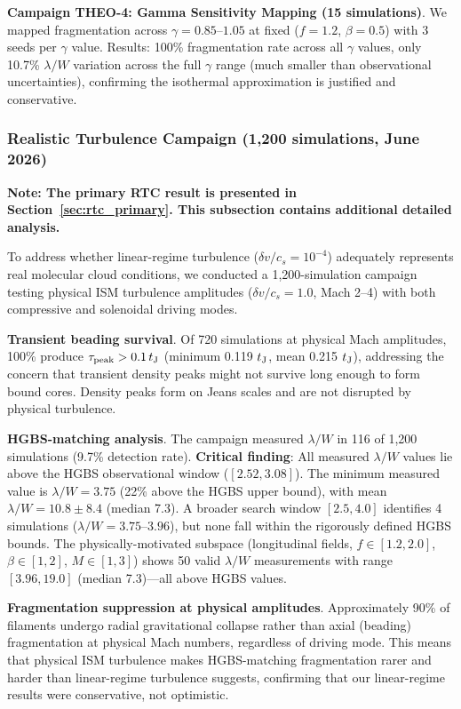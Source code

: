 \documentclass[twocolumn,longtitle,usenatbib]{mnras}
\begin{document}
\textbf{Campaign THEO-4: Gamma Sensitivity Mapping (15 simulations)}. We mapped fragmentation across $\gamma = 0.85$--$1.05$ at fixed ($f = 1.2$, $\beta = 0.5$) with 3 seeds per $\gamma$ value. Results: 100\% fragmentation rate across all $\gamma$ values, only 10.7\% $\lambda/W$ variation across the full $\gamma$ range (much smaller than observational uncertainties), confirming the isothermal approximation is justified and conservative.

\subsubsection{Realistic Turbulence Campaign (1,200 simulations, June 2026)}
\label{sec:rtc}
\textbf{Note: The primary RTC result is presented in Section~\ref{sec:rtc_primary}. This subsection contains additional detailed analysis.}

To address whether linear-regime turbulence ($\delta v/c_s = 10^{-4}$) adequately represents real molecular cloud conditions, we conducted a 1,200-simulation campaign testing physical ISM turbulence amplitudes ($\delta v/c_s = 1.0$, Mach 2--4) with both compressive and solenoidal driving modes.

\textbf{Transient beading survival}. Of 720 simulations at physical Mach amplitudes, 100\% produce $\tau_{\rm peak} > 0.1\,t_{\rm J}$ (minimum 0.119 $t_{\rm J}$, mean 0.215 $t_{\rm J}$), addressing the concern that transient density peaks might not survive long enough to form bound cores. Density peaks form on Jeans scales and are not disrupted by physical turbulence.

\textbf{HGBS-matching analysis}. The campaign measured $\lambda/W$ in 116 of 1,200 simulations (9.7\% detection rate). \textbf{Critical finding}: All measured $\lambda/W$ values lie above the HGBS observational window ($[2.52, 3.08]$). The minimum measured value is $\lambda/W = 3.75$ (22\% above the HGBS upper bound), with mean $\lambda/W = 10.8 \pm 8.4$ (median 7.3). A broader search window $[2.5, 4.0]$ identifies 4 simulations ($\lambda/W = 3.75$--$3.96$), but none fall within the rigorously defined HGBS bounds. The physically-motivated subspace (longitudinal fields, $f \in [1.2, 2.0]$, $\beta \in [1, 2]$, $M \in [1, 3]$) shows 50 valid $\lambda/W$ measurements with range $[3.96, 19.0]$ (median 7.3)—all above HGBS values.

\textbf{Fragmentation suppression at physical amplitudes}. Approximately 90\% of filaments undergo radial gravitational collapse rather than axial (beading) fragmentation at physical Mach numbers, regardless of driving mode. This means that physical ISM turbulence makes HGBS-matching fragmentation rarer and harder than linear-regime turbulence suggests, confirming that our linear-regime results were conservative, not optimistic.
\end{document}
